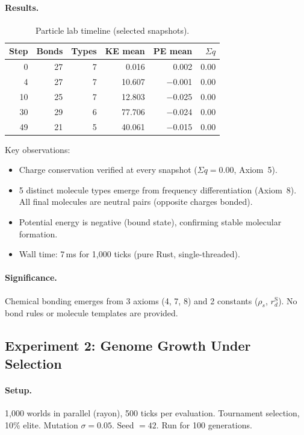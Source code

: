 \documentclass[11pt,a4paper]{article}
\begin{document}
\paragraph{Results.}
\begin{table}[h]
\centering
\caption{Particle lab timeline (selected snapshots).}
\label{tab:particle-results}
\small
\begin{tabular}{@{}rrrrrr@{}}
\toprule
\textbf{Step} & \textbf{Bonds} & \textbf{Types} & \textbf{KE mean} & \textbf{PE mean} & $\Sigma q$ \\
\midrule
0  & 27 & 7 & 0.016 & 0.002 & 0.00 \\
4  & 27 & 7 & 10.607 & $-$0.001 & 0.00 \\
10 & 25 & 7 & 12.803 & $-$0.025 & 0.00 \\
30 & 29 & 6 & 77.706 & $-$0.024 & 0.00 \\
49 & 21 & 5 & 40.061 & $-$0.015 & 0.00 \\
\bottomrule
\end{tabular}
\end{table}

Key observations:
\begin{itemize}
  \item Charge conservation verified at every snapshot
        ($\Sigma q = 0.00$, Axiom~5).
  \item 5 distinct molecule types emerge from frequency
        differentiation (Axiom~8). All final molecules are
        neutral pairs (opposite charges bonded).
  \item Potential energy is negative (bound state),
        confirming stable molecular formation.
  \item Wall time: 7\,ms for 1{,}000 ticks
        (pure Rust, single-threaded).
\end{itemize}

\paragraph{Significance.}
Chemical bonding emerges from 3 axioms (4, 7, 8) and
2 constants ($\rho_s$, $r_d^{\text{S}}$).
No bond rules or molecule templates are provided.

\subsection{Experiment 2: Genome Growth Under Selection}

\paragraph{Setup.}
1{,}000 worlds in parallel (rayon), 500 ticks per evaluation.
Tournament selection, 10\% elite. Mutation $\sigma = 0.05$.
Seed $= 42$. Run for 100 generations.
\end{document}
